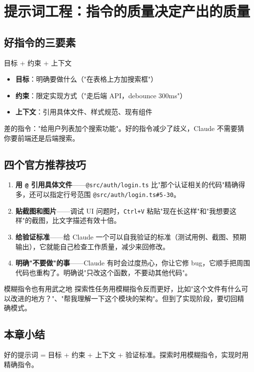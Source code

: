 \section{提示词工程：指令的质量决定产出的质量}

\subsection{好指令的三要素}

\begin{importantbox}{目标 + 约束 + 上下文}
\begin{itemize}[leftmargin=1.5em]
  \item \textbf{目标}：明确要做什么（"在表格上方加搜索框"）
  \item \textbf{约束}：限定实现方式（"走后端 API，debounce 300ms"）
  \item \textbf{上下文}：引用具体文件、样式规范、现有组件
\end{itemize}
差的指令："给用户列表加个搜索功能"。好的指令减少了歧义，Claude 不需要猜你要前端还是后端搜索。
\end{importantbox}

\subsection{四个官方推荐技巧}

\begin{enumerate}[leftmargin=1.5em]
  \item \textbf{用 \texttt{@} 引用具体文件}——\texttt{@src/auth/login.ts} 比"那个认证相关的代码"精确得多，还可以指定行号范围 \texttt{@src/auth/login.ts\#5-30}。
  \item \textbf{贴截图和图片}——调试 UI 问题时，\texttt{Ctrl+V} 粘贴"现在长这样"和"我想要这样"的截图，比文字描述有效十倍。
  \item \textbf{给验证标准}——给 Claude 一个可以自我验证的标准（测试用例、截图、预期输出），它就能自己检查工作质量，减少来回修改。
  \item \textbf{明确"不要做"的事}——Claude 有时会过度热心，你让它修 bug，它顺手把周围代码也重构了。明确说"只改这个函数，不要动其他代码"。
\end{enumerate}

\begin{knowledgebox}{模糊指令也有用武之地}
探索性任务用模糊指令反而更好，比如"这个文件有什么可以改进的地方？"、"帮我理解一下这个模块的架构"。但到了实现阶段，要切回精确模式。
\end{knowledgebox}

\subsection{本章小结}

好的提示词 = 目标 + 约束 + 上下文 + 验证标准。探索时用模糊指令，实现时用精确指令。


